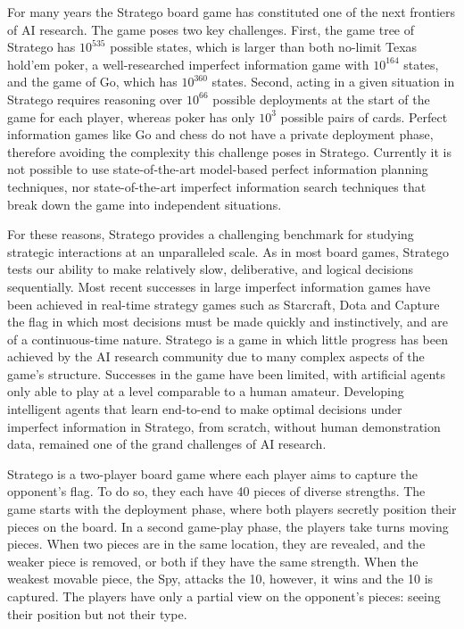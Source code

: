 For many years the Stratego board game has constituted one of the next frontiers of AI research. The game poses two key challenges. First, the game tree of Stratego has $10^{535}$ possible states, which is larger than both no-limit Texas hold'em poker, a well-researched imperfect information game with $10^{164}$ states, and the game of Go, which has $10^{360}$ states. Second, acting in a given situation in Stratego requires reasoning over $10^{66}$ possible deployments at the start of the game for each player, whereas poker has only $10^3$ possible pairs of cards. Perfect information games like Go and chess do not have a private deployment phase, therefore avoiding the complexity this challenge poses in Stratego. Currently it is not possible to use state-of-the-art model-based perfect information planning techniques, nor state-of-the-art imperfect information search techniques that break down the game into independent situations.

For these reasons, Stratego provides a challenging benchmark for studying strategic interactions at an unparalleled scale. As in most board games, Stratego tests our ability to make relatively slow, deliberative, and logical decisions sequentially. Most recent successes in large imperfect information games have been achieved in real-time strategy games such as Starcraft, Dota and Capture the flag in which most decisions must be made quickly and instinctively, and are of a continuous-time nature. Stratego is a game in which little progress has been achieved by the AI research community due to many complex aspects of the game's structure. Successes in the game have been limited, with artificial agents only able to play at a level comparable to a human amateur. Developing intelligent agents that learn end-to-end to make optimal decisions under imperfect information in Stratego, from scratch, without human demonstration data, remained one of the grand challenges of AI research.

Stratego is a two-player board game where each player aims to capture the opponent's flag. To do so, they each have 40 pieces of diverse strengths. The game starts with the deployment phase, where both players secretly position their pieces on the board. In a second game-play phase, the players take turns moving pieces. When two pieces are in the same location, they are revealed, and the weaker piece is removed, or both if they have the same strength. When the weakest movable piece, the Spy, attacks the 10, however, it wins and the 10 is captured. The players have only a partial view on the opponent's pieces: seeing their position but not their type.

